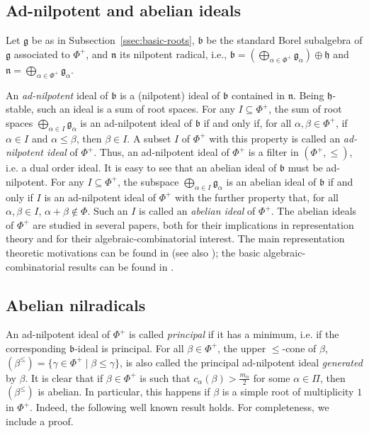 \documentclass[10pt]{amsart}
\theoremstyle{definition}
\theoremstyle{remark}
\newcommand\mf{\mathfrak}
\newcommand\al{\alpha}
\newcommand\be{\beta}
\newcommand\ga{\gamma}
\renewcommand{\leq}{\leqslant}
\begin{document}
\subsection{Ad-nilpotent and abelian ideals}\label{ssec:adnilpotent}

\par
Let $\mf g$ be as in Subsection~\ref{ssec:basic-roots}, 
$\mf b$ be the standard Borel subalgebra of $\mf g$ associated to $\Phi^+$,  and $\mf n$ its nilpotent radical, i.e., $\mf b=\left(\bigoplus_{\al\in\Phi^+}\mf g_\al\right)\oplus \mf h$ and $\mf n=\bigoplus_{\al\in\Phi^+}\mf g_\al$. 

\par
An {\it ad-nilpotent} ideal of $\mf b$ is a (nilpotent) ideal of $\mf b$ contained in $\mf n$. 
Being $\mf h$-stable, such an ideal is a sum of root spaces.
For any $I\subseteq \Phi^+$, the sum of root spaces $\bigoplus_{\al\in I} \mf g_\al$ is an ad-nilpotent ideal of $\mf b$ if and only if, for all $\al, \beta\in \Phi^+$, if $\al\in I$ and $\al\leq \beta$, then $\beta\in I$. 
A subset $I$ of $\Phi^+$ with this property is called an {\it ad-nilpotent ideal} of $\Phi^+$.
Thus, an ad-nilpotent ideal of $\Phi^+$ is a filter in $(\Phi^+, \leq)$, i.e. a dual order ideal. 
It is easy to see that an abelian ideal of $\mf b$ must be ad-nilpotent. 
For any  $I\subseteq \Phi^+$, the subspace $\bigoplus_{\al\in I} \mf g_\al$ is an abelian ideal of $\mf b$ if and only if $I$ is an ad-nilpotent ideal of $\Phi^+$ with the further property that, for all $\al, \beta\in I$, $\al+\beta\not\in \Phi$. 
Such an $I$ is called an {\it abelian ideal} of $\Phi^+$.
The  abelian ideals of $\Phi^+$ are studied in several papers, both for their implications in representation theory and for their algebraic-combinatorial interest. 
The main representation theoretic motivations  can be found in \cite{Ko1, Ko2} (see also \cite{CMP}); the basic algebraic-combinatorial results can be found in \cite{CPadnilp1, CPab, Pan, Su}.


\subsection{Abelian nilradicals}\label{ssec:abnil}

\par
An ad-nilpotent ideal of $\Phi^+$ is called {\it principal} if it has a minimum, i.e. if the corresponding $\mf b$-ideal is principal. 
For all $\be\in \Phi^+$, the upper $\leq$-cone of $\be$, $(\be^\leq)=\{\ga\in \Phi^+\mid \be\leq \ga\}$, is also called the principal ad-nilpotent ideal {\it generated} by $\be$.  
It is clear that if $\be\in \Phi^+$ is such that $c_\al(\be)>\frac{m_\al}{2}$ for some $\al\in \Pi$, then $(\be^\leq)$ is abelian. 
In particular, this happens if $\be$ is a simple root of  multiplicity $1$ in $\Phi^+$. 
Indeed, the following well known result holds. 
For completeness, we include a proof.
\par
\end{document}
